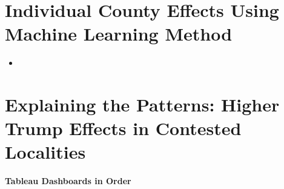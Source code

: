 \documentclass{article}
\begin{document}
\section{Individual County Effects Using Machine Learning Method}

\begin{itemize}
	\item 
\end{itemize}

\section{Explaining the Patterns: Higher Trump Effects in Contested Localities}



\newpage

\textbf{Tableau Dashboards in Order}
\end{document}
